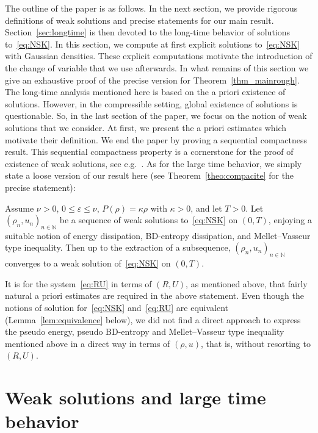 \documentclass[AHL,Unicode,longabstracts]{cedram}
\newcommand*\N{\mathbb{N}}
\newcommand*\<{\left\langle}
\renewcommand*\>{\right\rangle}
\renewcommand*\le{\leqslant}
\newcommand*\eps{\varepsilon}
\begin{document}
The outline of the paper is as follows. In the next section, we provide rigorous definitions of weak solutions and precise statements for our main result. Section~\ref{sec:longtime} is then devoted to the long-time behavior of solutions to~\eqref{eq:NSK}. In this section, we compute at first explicit solutions to~\eqref{eq:NSK} with Gaussian densities. These explicit computations motivate the introduction of the change of variable that we use afterwards. In what remains of this section we give an exhaustive proof of the precise version for Theorem~\ref{thm_mainrough}. The long-time analysis mentioned here is based on the a priori existence of solutions. However, in the compressible setting, global existence of solutions is questionable. So, in the last section of the paper, we focus on the notion of weak solutions that we consider. At first, we present the a priori estimates which motivate their definition. We end the paper by proving a sequential compactness result. This sequential compactness property is a cornerstone for the proof of existence of weak solutions, see e.g.~\cite{Lio98,Fei04}. As for the large time behavior, we simply state a loose version of our result here (see Theorem~\ref{theo:compacite} for the precise statement):
\begin{theo}
Assume $\nu >0$, $0\le \eps \le \nu$, $P(\rho)=\kappa \rho$ with $\kappa>0$, and let $T>0$. Let $(\rho_n,u_n)_{n\in \N}$ be a sequence of weak solutions to~\eqref{eq:NSK} on $(0,T)$, enjoying a suitable notion of energy dissipation, BD-entropy dissipation, and Mellet--Vasseur type inequality. Then up to the extraction of a subsequence, $(\rho_n,u_n)_{n\in \N}$ converges to a weak solution of~\eqref{eq:NSK} on $(0,T)$.
\end{theo}

It is for the system~\eqref{eq:RU} in terms of $(R,U)$, as mentioned above, that fairly natural a priori estimates are required in the above statement. Even though the notions of solution for~\eqref{eq:NSK} and~\eqref{eq:RU} are equivalent (Lemma~\ref{lem:equivalence} below), we did not find a direct approach to express the pseudo energy, pseudo BD-entropy and Mellet--Vasseur type inequality mentioned above in a direct way in terms of $(\rho,u)$, that is, without resorting to $(R,U)$.



\section{Weak solutions and large time behavior}\label{sec:main}
\end{document}
